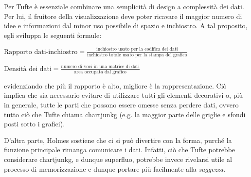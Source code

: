 Per Tufte è essenziale combinare una semplicità di design a complessità dei dati. Per lui, il fruitore della visualizzazione deve poter ricavare il maggior numero di idee e informazioni dal minor uso possibile di spazio e inchiostro.
A tal proposito, egli sviluppa le seguenti formule: 
\begin{center}
    $\text{Rapporto dati-inchiostro} = \frac{\text{inchiostro usato per la codifica dei dati}}{\text{inchiostro totale usato per la stampa del grafico}}$
\end{center}
\begin{center}
    $\text{Densità dei dati} = \frac{\text{numero di voci in una matrice di dati}}{\text{area occupata dal grafico}}$            %
\end{center}
evidenziando che più il rapporto è alto, migliore è la rappresentazione. Ciò implica che sia necessario evitare di utilizzare tutti gli elementi decorativi o, più in generale, tutte le parti che possono essere omesse 
senza perdere dati, ovvero tutto ciò che Tufte chiama \gls{chartjunkg} (e.g. la maggior parte delle griglie e sfondi posti sotto i grafici).

D'altra parte, Holmes sostiene che ci si può divertire con la forma, purché la funzione principale rimanga comunicare i dati. Infatti, ciò che Tufte potrebbe considerare \gls{chartjunkg}, e dunque superfluo,
potrebbe invece rivelarsi utile al processo di memorizzazione e dunque portare più facilmente alla \emph{saggezza}. 

